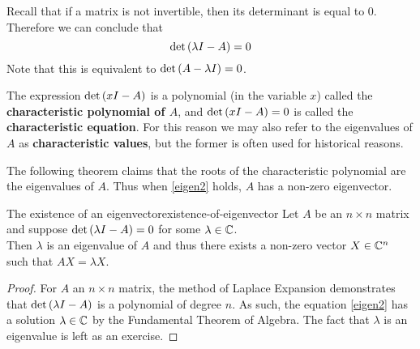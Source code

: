 Recall that if a matrix
is not invertible, then its determinant is equal to $0$.  Therefore we
can conclude that
\begin{equation}
\det \left(\lambda I - A\right) =0  \label{eigen2}
\end{equation}
Note that this is equivalent to $\det \left(A- \lambda I \right) =0$. 

The expression $\det \left(x I-A\right) $ is a polynomial (in
the variable $x$) called the
\textbf{characteristic polynomial of $A$}, and 
$\det \left(x I-A\right) =0$ is called the \textbf{characteristic
equation}. For this reason we may also refer to
the eigenvalues of $A$ as \textbf{characteristic values}, but the
former is often used for historical reasons.

The following theorem claims that the roots of the characteristic
polynomial are the eigenvalues of $A$.  Thus when \ref{eigen2}
holds, $A$ has a non-zero eigenvector.

\begin{theorem}{The existence of an eigenvector}{existence-of-eigenvector}
Let $A$ be an $n\times n$ matrix and suppose $\det \left(\lambda I -
A\right) =0$ for some $ \lambda \in \mathbb{C}$.  \\
Then $\lambda$ is an eigenvalue of $A$ and thus there exists a non-zero
vector $X \in \mathbb{C}^{n}$ such that $AX=\lambda X$. 
\end{theorem}

\begin{proof}
For $A$ an $n\times n$ matrix, the method of Laplace
Expansion demonstrates that $\det \left(\lambda I - A \right) $ is a
polynomial of degree $n.$ As such, the equation
\ref{eigen2} has a solution $\lambda \in \mathbb{C}$ by the Fundamental
Theorem of Algebra. The fact that $\lambda$ is an eigenvalue is left as an exercise. 
\end{proof}
